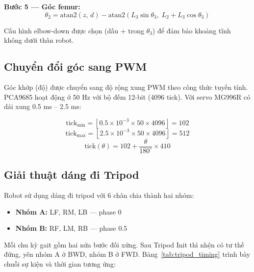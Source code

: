         \textbf{Bước 5 — Góc femur:}
        \begin{equation}
            \theta_2 = \mathrm{atan2}(z,\, d) - \mathrm{atan2}\!\left(L_3\sin\theta_3,\; L_2 + L_3\cos\theta_3\right)
        \end{equation}

        Cấu hình elbow-down được chọn (dấu $+$ trong $\theta_3$) để đảm bảo khoảng tĩnh không dưới thân robot.

        \subsection{Chuyển đổi góc sang PWM}

        \hspace{0.5cm} Góc khớp (độ) được chuyển sang độ rộng xung PWM theo công thức tuyến tính. PCA9685 hoạt động ở 50 Hz với bộ đếm 12-bit (4096 tick). Với servo MG996R có dải xung 0.5 ms -- 2.5 ms:

        \begin{equation}
            \text{tick}_{\min} = \left\lfloor 0.5 \times 10^{-3} \times 50 \times 4096 \right\rfloor = 102
        \end{equation}
        \begin{equation}
            \text{tick}_{\max} = \left\lfloor 2.5 \times 10^{-3} \times 50 \times 4096 \right\rfloor = 512
        \end{equation}
        \begin{equation}
            \text{tick}(\theta) = 102 + \frac{\theta}{180^\circ} \times 410
        \end{equation}

        \subsection{Giải thuật dáng đi Tripod}

        \hspace{0.5cm} Robot sử dụng dáng đi tripod với 6 chân chia thành hai nhóm:
        \begin{itemize}
            \item \textbf{Nhóm A:} LF, RM, LB — phase 0
            \item \textbf{Nhóm B:} RF, LM, RB — phase 0.5 
        \end{itemize}

        Mỗi chu kỳ gait gồm hai nửa bước đối xứng. Sau Tripod Init thì nhện có tư thế đứng, yên nhóm A ở BWD, nhóm B ở FWD. Bảng~\ref{tab:tripod_timing} trình bày chuỗi sự kiện và thời gian tương ứng:


